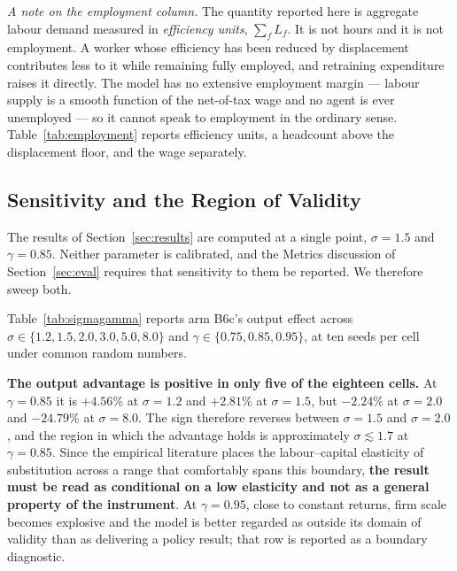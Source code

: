 \documentclass[journal]{IEEEtran}
\theoremstyle{plain}
\theoremstyle{definition}
\begin{document}
\emph{A note on the employment column.} The quantity reported here is aggregate
labour demand measured in \emph{efficiency units}, $\sum_f L_f$. It is not hours
and it is not employment. A worker whose efficiency has been reduced by
displacement contributes less to it while remaining fully employed, and
retraining expenditure raises it directly. The model has no extensive
employment margin --- labour supply is a smooth function of the net-of-tax wage
and no agent is ever unemployed --- so it cannot speak to employment in the
ordinary sense. Table~\ref{tab:employment} reports efficiency units, a headcount
above the displacement floor, and the wage separately.







\subsection{Sensitivity and the Region of Validity}
\label{sec:sensitivity}

The results of Section~\ref{sec:results} are computed at a single point,
$\sigma = 1.5$ and $\gamma = 0.85$. Neither parameter is calibrated, and the
Metrics discussion of Section~\ref{sec:eval} requires that sensitivity to them
be reported. We therefore sweep both.

Table~\ref{tab:sigmagamma} reports arm B6c's output effect across
$\sigma \in \{1.2, 1.5, 2.0, 3.0, 5.0, 8.0\}$ and
$\gamma \in \{0.75, 0.85, 0.95\}$, at ten seeds per cell under common random
numbers.

\textbf{The output advantage is positive in only five of the eighteen cells.}
At $\gamma = 0.85$ it is $+4.56\%$ at $\sigma = 1.2$ and $+2.81\%$ at
$\sigma = 1.5$, but $-2.24\%$ at $\sigma = 2.0$ and $-24.79\%$ at
$\sigma = 8.0$. The sign therefore reverses between $\sigma = 1.5$ and
$\sigma = 2.0$, and the region in which the advantage holds is approximately
$\sigma \lesssim 1.7$ at $\gamma = 0.85$. Since the empirical literature places
the labour--capital elasticity of substitution across a range that comfortably
spans this boundary, \textbf{the result must be read as conditional on a low
elasticity and not as a general property of the instrument}. At
$\gamma = 0.95$, close to constant returns, firm scale becomes explosive and the
model is better regarded as outside its domain of validity than as delivering a
policy result; that row is reported as a boundary diagnostic.
\end{document}
